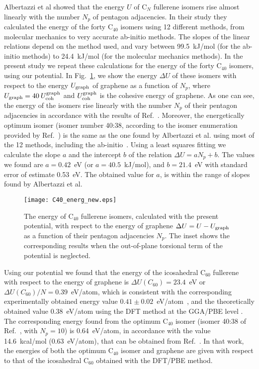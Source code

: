 \documentclass[aps,prb,floatfix,twocolumn,showpacs]{revtex4}
\begin{document}
Albertazzi et al\cite{Fowler} showed that the energy $U$ of C$_{N}$ fullerene 
isomers rise almost linearly with the number $N_p$ of pentagon adjacencies.  
In their study they calculated the energy of the forty C$_{40}$ isomers
using 12 different methods, from molecular mechanics to 
very accurate ab-initio methods. The slopes of the linear relations depend on the
method used, and vary between 99.5~kJ/mol (for the ab-initio methods)
to 24.4~kJ/mol (for the molecular mechanics methods).
In the present study we repeat these calculations for the 
energy of the forty C$_{40}$ isomers, using our potential. 
In Fig.~\ref{fig:figure1}, we show the energy $\Delta U$ of these isomers 
with respect to the energy $U_{\rm graph}$ of graphene as a function of $N_p$,
where $U_{\rm graph}=40\:U_{\rm coh}^{\rm graph}$ and $U_{\rm coh}^{\rm graph}$ is the 
cohesive energy of graphene.
As one can see, the energy of the isomers rise linearly with the number $N_p$ of their
pentagon adjacencies in accordance with the results of Ref.~.
Moreover,  the energetically optimum isomer (isomer number 40:38, according to the isomer
enumeration provided by Ref.~) is the same as the one found by Albertazzi et al.
using most of the 12 methods, including the ab-initio~\cite{Fowler}.
Using a least squares fitting we calculate the slope $a$ and the intercept  $b$ of the relation
$\Delta U=aN_p+b$. The values we found are  $a=0.42$~eV (or $a=40.5$~kJ/mol), 
and $b=21.4$~eV with standard error of estimate 0.53~eV.
The obtained value for $a$, is within the range of slopes found by  Albertazzi et al.

\begin{figure}[!tb]
\texttt{[image: C40\_energ\_new.eps]}
\caption{
The energy of C$_{40}$ fullerene isomers, calculated with the present potential, with 
respect to the energy of 
graphene $\Delta U=U-U_{\rm graph}$ as a function of their pentagon adjacencies $N_p$.
The inset shows the corresponding results when the out-of-plane torsional term of the
potential is neglected.}
\label{fig:figure1}
\end{figure}


Using our potential we found that the energy of
the icosahedral C$_{60}$ fullerene with respect to the energy of graphene is 
$\Delta U(C_{60})=23.4$~eV or 
$\Delta U(C_{60})/N=0.39$~eV/atom, which is consistent with the corresponding experimentally 
obtained energy value $0.41 \pm 0.02$~eV/atom~\cite{flakes,Chen}, and the theoretically
obtained value 0.38~eV/atom using the DFT method at the GGA/PBE level \cite{fullerenes_2016}.
The corresponding energy found from the optimum C$_{40}$ isomer 
(isomer 40:38 of Ref.~, with $N_p=10$)
is 0.64~eV/atom, in accordance with the value 14.6~kcal/mol (0.63~eV/atom),
that can be obtained from Ref.~. In that work, the energies of both
the optimum C$_{40}$ isomer and graphene are given with respect to that of the icosahedral C$_{60}$
obtained with the DFT/PBE method.
\end{document}
